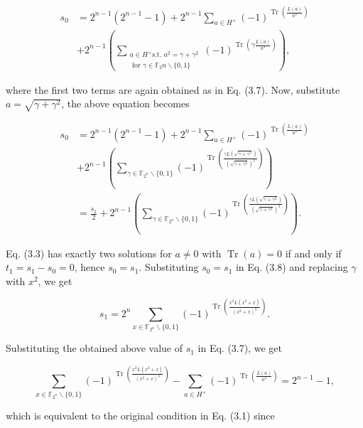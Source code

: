\documentclass[10pt]{article}
\begin{document}
$$
\begin{aligned}
s_{0} & =2^{n-1}\left(2^{n-1}-1\right)+2^{n-1} \sum_{a \in H^{\times}}(-1)^{\operatorname{Tr}\left(\frac{L(a)}{a^{3}}\right)} \\
& +2^{n-1}\left(\sum_{\substack{a \in H^{\times} \text {s.t. } a^{2}=\gamma+\gamma^{2} \\
\text { for } \gamma \in \mathbb{F}_{2} n \backslash\{0,1\}}}(-1)^{\operatorname{Tr}\left(\gamma \frac{L(a)}{a^{3}}\right)}\right),
\end{aligned}
$$

where the first two terms are again obtained as in Eq. (3.7). Now, substitute $a= \sqrt{\gamma+\gamma^{2}}$, the above equation becomes


\begin{align*}
s_{0} & =2^{n-1}\left(2^{n-1}-1\right)+2^{n-1} \sum_{a \in H^{\times}}(-1)^{\operatorname{Tr}\left(\frac{L(a)}{a^{3}}\right)} \\
& +2^{n-1}\left(\sum_{\gamma \in \mathbb{F}_{2^{n}} \backslash\{0,1\}}(-1)^{\operatorname{Tr}\left(\frac{\gamma L\left(\sqrt{\gamma+\gamma^{2}}\right)}{\left(\sqrt{\gamma+\gamma^{2}}\right)^{3}}\right)}\right)  \tag{3.8}\\
& =\frac{s_{1}}{2}+2^{n-1}\left(\sum_{\gamma \in \mathbb{F}_{2^{n}} \backslash\{0,1\}}(-1)^{\operatorname{Tr}\left(\frac{\gamma L\left(\sqrt{\gamma+\gamma^{2}}\right)}{\left(\sqrt{\gamma+\gamma^{2}}\right)^{3}}\right)}\right) .
\end{align*}


Eq. (3.3) has exactly two solutions for $a \neq 0$ with $\operatorname{Tr}(a)=0$ if and only if $t_{1}= s_{1}-s_{0}=0$, hence $s_{0}=s_{1}$. Substituting $s_{0}=s_{1}$ in Eq. (3.8) and replacing $\gamma$ with $x^{2}$, we get


\begin{equation*}
s_{1}=2^{n} \sum_{x \in \mathbb{F}_{2^{n}} \backslash\{0,1\}}(-1)^{\operatorname{Tr}\left(\frac{x^{2} L\left(x^{2}+x\right)}{\left(x^{2}+x\right)^{3}}\right)} . \tag{3.9}
\end{equation*}


Substituting the obtained above value of $s_{1}$ in Eq. (3.7), we get

$$
\sum_{x \in \mathbb{F}_{2^{n}} \backslash\{0,1\}}(-1)^{\operatorname{Tr}\left(\frac{x^{2} L\left(x^{2}+x\right)}{\left(x^{2}+x\right)^{3}}\right)}-\sum_{a \in H^{\times}}(-1)^{\operatorname{Tr}\left(\frac{L(a)}{a^{3}}\right)}=2^{n-1}-1,
$$

which is equivalent to the original condition in Eq. (3.1) since
\end{document}
